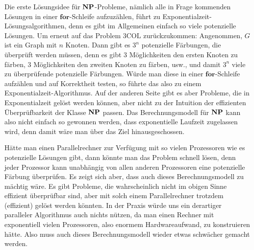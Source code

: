 Die erste Lösungsidee für $\mathbf{N}\mathbf{P}$-Probleme, nämlich alle in Frage
kommenden Lösungen in einer $\mathbf{for}$-Schleife aufzuzählen, führt
zu Exponentialzeit-Lösungsalgorithmen, denn es gibt im Allgemeinen
einfach so viele potenzielle Lösungen. Um erneut auf das Problem
$3\mathrm{COL}$ zurückzukommen: Angenommen, $G$ ist ein Graph mit $n$
Knoten. Dann gibt es $3^n$ potenzielle Färbungen, die überprüft werden
müssen, denn es gibt $3$ Möglichkeiten den ersten Knoten zu färben,
$3$ Möglichkeiten den zweiten Knoten zu färben, usw., und damit $3^n$
viele zu überprüfende potenzielle Färbungen. Würde man diese in einer
$\mathbf{for}$-Schleife aufzählen und auf Korrektheit testen, so
führte das also zu einem Exponentialzeit-Algorithmus.  Auf der anderen
Seite gibt es aber Probleme, die in Exponentialzeit gelöst werden
können, aber nicht zu der Intuition der effizienten Überprüfbarkeit
der Klasse $\mathbf{N}\mathbf{P}$ passen.  Das Berechnungsmodell für $\mathbf{N}\mathbf{P}$ kann also
nicht einfach so gewonnen werden, dass exponentielle Laufzeit
zugelassen wird, denn damit wäre man über das Ziel hinausgeschossen.

Hätte man einen Parallelrechner zur Verfügung mit so vielen
Prozessoren wie es potenzielle Lösungen gibt, dann könnte man das
Problem schnell lösen, denn jeder Prozessor kann unabhängig von allen
anderen Prozessoren eine potenzielle Färbung überprüfen. Es zeigt sich
aber, dass auch dieses Berechnungsmodell zu mächtig wäre. Es gibt
Probleme, die wahrscheinlich nicht im obigen Sinne effizient
überprüfbar sind, aber mit solch einem Parallelrechner trotzdem
(effizient) gelöst werden könnten. In der Praxis würde uns ein
derartiger paralleler Algorithmus auch nichts nützen, da man einen
Rechner mit exponentiell vielen Prozessoren, also enormem
Hardwareaufwand, zu konstruieren hätte. Also muss auch dieses
Berechnungsmodell wieder etwas schwächer gemacht werden.

